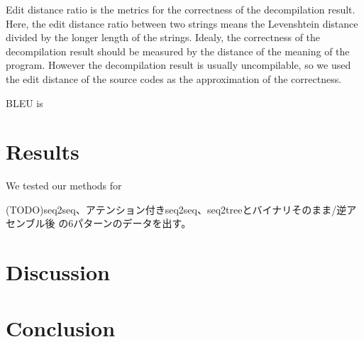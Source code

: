 \documentclass[senior,final,11pt]{iscs-thesis}
\begin{document}
Edit distance ratio is the metrics for the correctness of the decompilation result.
Here, the edit distance ratio between two strings means the Levenshtein distance divided by the longer length of the strings.
Idealy, the correctness of the decompilation result should be measured by the distance of the meaning of the program.
However the decompilation result is usually uncompilable, so we used the edit distance of the source codes as the approximation of the correctness.

BLEU is 

\chapter{Results}

We tested our methods for 


(TODO)seq2seq、アテンション付きseq2seq、seq2treeとバイナリそのまま/逆アセンブル後 の6パターンのデータを出す。
\chapter{Discussion}
\chapter{Conclusion}



\end{document}
